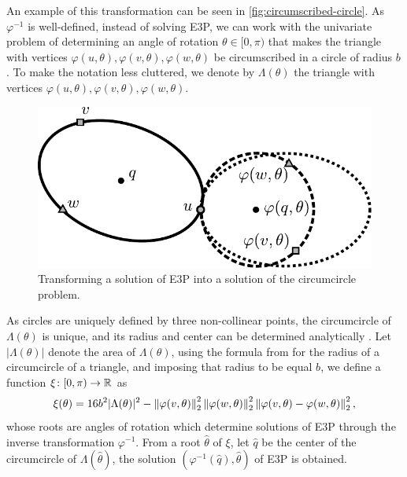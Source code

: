An example of this transformation can be seen in \autoref{fig:circumscribed-circle}. As $\varphi^{-1}$ is well-defined, instead of solving E3P, we can work with the univariate problem of determining an angle of rotation $\theta \in [0, \pi)$ that makes the triangle with vertices $\varphi(u, \theta), \varphi(v, \theta), \varphi(w, \theta)$ be circumscribed in a circle of radius $b$. To make the notation less cluttered, we denote by $\Lambda(\theta)$ the triangle with vertices $\varphi(u, \theta), \varphi(v, \theta), \varphi(w, \theta)$.

\begin{figure}[!htb]
	\centering
	
	\includegraphics[scale=.8]{figures/circumscribed-circle}
	\caption{Transforming a solution of E3P into a solution of the circumcircle problem.}
	\label{fig:circumscribed-circle}
\end{figure}

As circles are uniquely defined by three non-collinear points, the circumcircle of $\Lambda(\theta)$ is unique, and its radius and center can be determined analytically \cite{weisstein}.
Let $|\Lambda(\theta)|$ denote the area of $\Lambda(\theta)$, using the formula from \cite[p.~189]{johnson1960} for the radius of a circumcircle of a triangle, and imposing that radius to be equal $b$, we define a function $\xi \colon [0, \pi) \to \mathbb{R}$ as
\begin{equation}\label{eq:xi}
\xi(\theta) = 16b^2|\Lambda(\theta)|^2 - \left\lVert\varphi(v, \theta)\right\rVert_{2}^2\left\lVert\varphi(w, \theta)\right\rVert_{2}^2\left\lVert\varphi(v, \theta)-\varphi(w, \theta)\right\rVert_{2}^2,
\end{equation}
whose roots are angles of rotation which determine solutions of E3P through the inverse transformation $\varphi^{-1}$.
From a root $\hat{\theta}$ of $\xi$, let $\hat{q}$ be the center of the circumcircle of $\Lambda(\hat{\theta})$, the solution $(\varphi^{-1}(\hat{q}), \hat{\theta})$ of E3P is obtained. 

